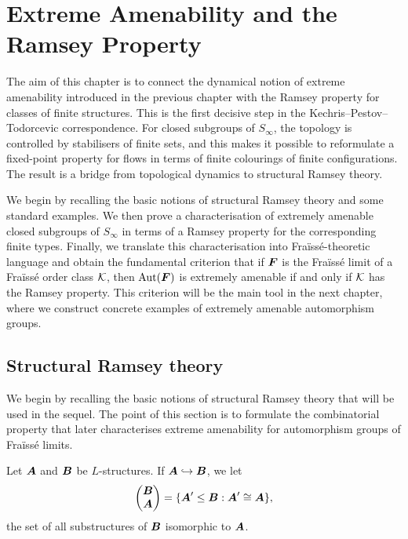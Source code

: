 \chapter[Extreme Amenability and Ramsey Theory]{Extreme Amenability and the Ramsey Property}
\label{chap:extreme-amenability-ramsey}

The aim of this chapter is to connect the dynamical notion of extreme amenability introduced in the previous chapter with the Ramsey property for classes of finite structures. This is the first decisive step in the Kechris--Pestov--Todorcevic correspondence. For closed subgroups of \(S_\infty\), the topology is controlled by stabilisers of finite sets, and this makes it possible to reformulate a fixed-point property for flows in terms of finite colourings of finite configurations. The result is a bridge from topological dynamics to structural Ramsey theory.

We begin by recalling the basic notions of structural Ramsey theory and some standard examples. We then prove a characterisation of extremely amenable closed subgroups of \(S_\infty\) in terms of a Ramsey property for the corresponding finite types. Finally, we translate this characterisation into Fraïssé-theoretic language and obtain the fundamental criterion that if \(\boldsymbol{F}\) is the Fraïssé limit of a Fraïssé order class \(\mathcal{K}\), then \(\operatorname{Aut}(\boldsymbol{F})\) is extremely amenable if and only if \(\mathcal{K}\) has the Ramsey property. This criterion will be the main tool in the next chapter, where we construct concrete examples of extremely amenable automorphism groups.


\section{Structural Ramsey theory}
\label{sec:structural-ramsey-theory}

We begin by recalling the basic notions of structural Ramsey theory that will be used in the sequel. The point of this section is to formulate the combinatorial property that later characterises extreme amenability for automorphism groups of Fraïssé limits.

Let \(\boldsymbol{A}\) and \(\boldsymbol{B}\) be \(L\)-structures. If \(\boldsymbol{A}\hookrightarrow \boldsymbol{B}\), we let
\[
    \begin{pmatrix} \boldsymbol{B} \\ \boldsymbol{A} \end{pmatrix}
    =
    \{\boldsymbol{A}' \leq \boldsymbol{B} : \boldsymbol{A}' \cong \boldsymbol{A}\},
\]
the set of all substructures of \(\boldsymbol{B}\) isomorphic to \(\boldsymbol{A}\).

